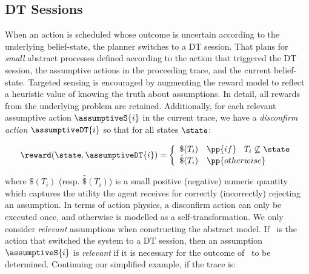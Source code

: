 
\subsection{DT Sessions}

When an action is scheduled whose outcome is uncertain according to
the underlying belief-state, the planner switches to a DT
session. That plans for {\em small} abstract processes defined
according to the action that triggered the DT session, the assumptive
actions in the proceeding trace, and the current
belief-state. Targeted sensing is encouraged by augmenting the reward
model to reflect a heuristic value of knowing the truth about
assumptions. In detail, all rewards from the underlying problem are
retained. Additionally, for each relevant assumptive action
$\assumptiveS{i}$ in the current trace, we have a {\em disconfirm
action} $\assumptiveDT{i}$ so that for all states $\state$:

\vspace{-1ex}
\small
\[
\reward(\state, \assumptiveDT{i}) = \bigg\{ \begin{array}{ll}
\$(T_i) & \pp{if}~\;\;T_i \not\subseteq \state \\
\hat\$(T_i) & \pp{otherwise} \\
\end{array}
\]
\normalsize

\vspace{-1ex}

\noindent where $\$(T_i)$ (resp. $\hat\$(T_i)$) is a
small positive (negative) numeric quantity which captures
the utility the agent receives for correctly (incorrectly) rejecting
an assumption.
In terms of action physics, a disconfirm action can only be executed
once, and otherwise is modelled as a self-transformation.
We only consider {\em relevant} assumptions when constructing the
abstract model.  If \switchAction\ is the action that switched the
system to a DT session, then an assumption $\assumptiveS{i}$ is {\em
relevant} if it is necessary for the outcome of \switchAction\ to be
determined.  Continuing our simplified example, if the trace is:

